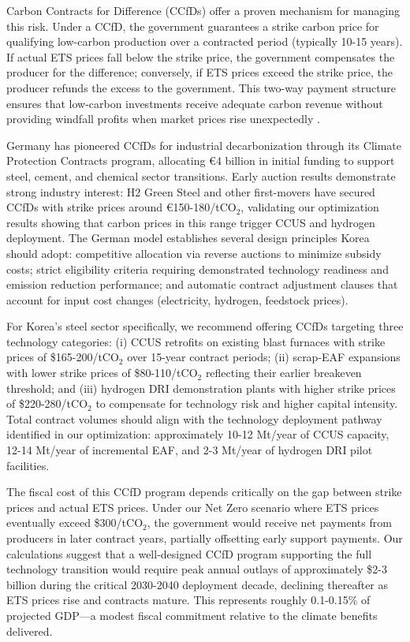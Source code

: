 \documentclass[preprint,1p,authoryear]{elsarticle}
\begin{document}
Carbon Contracts for Difference (CCfDs) offer a proven mechanism for managing this risk. Under a CCfD, the government guarantees a strike carbon price for qualifying low-carbon production over a contracted period (typically 10-15 years). If actual ETS prices fall below the strike price, the government compensates the producer for the difference; conversely, if ETS prices exceed the strike price, the producer refunds the excess to the government. This two-way payment structure ensures that low-carbon investments receive adequate carbon revenue without providing windfall profits when market prices rise unexpectedly \citep{Richstein2017CCfD}.

Germany has pioneered CCfDs for industrial decarbonization through its Climate Protection Contracts program, allocating €4 billion in initial funding to support steel, cement, and chemical sector transitions. Early auction results demonstrate strong industry interest: H2 Green Steel and other first-movers have secured CCfDs with strike prices around €150-180/tCO$_2$, validating our optimization results showing that carbon prices in this range trigger CCUS and hydrogen deployment. The German model establishes several design principles Korea should adopt: competitive allocation via reverse auctions to minimize subsidy costs; strict eligibility criteria requiring demonstrated technology readiness and emission reduction performance; and automatic contract adjustment clauses that account for input cost changes (electricity, hydrogen, feedstock prices).

For Korea's steel sector specifically, we recommend offering CCfDs targeting three technology categories: (i) CCUS retrofits on existing blast furnaces with strike prices of \$165-200/tCO$_2$ over 15-year contract periods; (ii) scrap-EAF expansions with lower strike prices of \$80-110/tCO$_2$ reflecting their earlier breakeven threshold; and (iii) hydrogen DRI demonstration plants with higher strike prices of \$220-280/tCO$_2$ to compensate for technology risk and higher capital intensity. Total contract volumes should align with the technology deployment pathway identified in our optimization: approximately 10-12 Mt/year of CCUS capacity, 12-14 Mt/year of incremental EAF, and 2-3 Mt/year of hydrogen DRI pilot facilities.

The fiscal cost of this CCfD program depends critically on the gap between strike prices and actual ETS prices. Under our Net Zero scenario where ETS prices eventually exceed \$300/tCO$_2$, the government would receive net payments from producers in later contract years, partially offsetting early support payments. Our calculations suggest that a well-designed CCfD program supporting the full technology transition would require peak annual outlays of approximately \$2-3 billion during the critical 2030-2040 deployment decade, declining thereafter as ETS prices rise and contracts mature. This represents roughly 0.1-0.15\% of projected GDP—a modest fiscal commitment relative to the climate benefits delivered.
\end{document}

